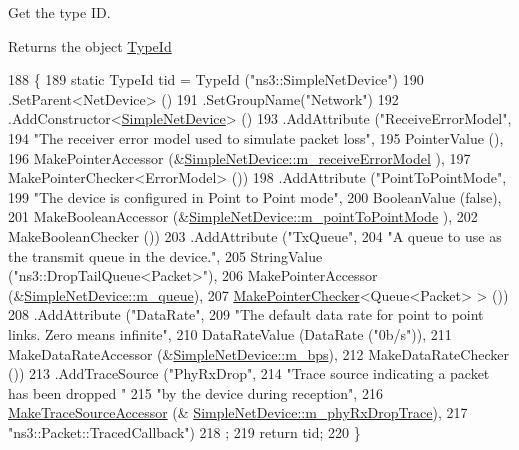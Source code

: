 Get the type ID. 

\begin{DoxyReturn}{Returns}
the object \hyperlink{classns3_1_1TypeId}{Type\+Id} 
\end{DoxyReturn}

\begin{DoxyCode}
188 \{
189   \textcolor{keyword}{static} TypeId tid = TypeId (\textcolor{stringliteral}{"ns3::SimpleNetDevice"})
190     .SetParent<NetDevice> ()
191     .SetGroupName(\textcolor{stringliteral}{"Network"}) 
192     .AddConstructor<\hyperlink{classns3_1_1SimpleNetDevice_ae329d675dae831a9e0534f02f415cf3e}{SimpleNetDevice}> ()
193     .AddAttribute (\textcolor{stringliteral}{"ReceiveErrorModel"},
194                    \textcolor{stringliteral}{"The receiver error model used to simulate packet loss"},
195                    PointerValue (),
196                    MakePointerAccessor (&\hyperlink{classns3_1_1SimpleNetDevice_aabf566ae9e1c8351769da712e7da1177}{SimpleNetDevice::m\_receiveErrorModel}
      ),
197                    MakePointerChecker<ErrorModel> ())
198     .AddAttribute (\textcolor{stringliteral}{"PointToPointMode"},
199                    \textcolor{stringliteral}{"The device is configured in Point to Point mode"},
200                    BooleanValue (\textcolor{keyword}{false}),
201                    MakeBooleanAccessor (&\hyperlink{classns3_1_1SimpleNetDevice_a9e0e98464addc8f65a1e95a405b7119c}{SimpleNetDevice::m\_pointToPointMode}
      ),
202                    MakeBooleanChecker ())
203     .AddAttribute (\textcolor{stringliteral}{"TxQueue"},
204                    \textcolor{stringliteral}{"A queue to use as the transmit queue in the device."},
205                    StringValue (\textcolor{stringliteral}{"ns3::DropTailQueue<Packet>"}),
206                    MakePointerAccessor (&\hyperlink{classns3_1_1SimpleNetDevice_a72e1e606223c7e4683f64259d14ef065}{SimpleNetDevice::m\_queue}),
207                    \hyperlink{namespacens3_a8cd81c2f226bc23ad44a259717e6da15}{MakePointerChecker}<Queue<Packet> > ())
208     .AddAttribute (\textcolor{stringliteral}{"DataRate"},
209                    \textcolor{stringliteral}{"The default data rate for point to point links. Zero means infinite"},
210                    DataRateValue (DataRate (\textcolor{stringliteral}{"0b/s"})),
211                    MakeDataRateAccessor (&\hyperlink{classns3_1_1SimpleNetDevice_a6655e469fb351d5c541abf96c2928daa}{SimpleNetDevice::m\_bps}),
212                    MakeDataRateChecker ())
213     .AddTraceSource (\textcolor{stringliteral}{"PhyRxDrop"},
214                      \textcolor{stringliteral}{"Trace source indicating a packet has been dropped "}
215                      \textcolor{stringliteral}{"by the device during reception"},
216                      \hyperlink{group__tracing_gab21a770b9855af4e8f69f7531ea4a6b0}{MakeTraceSourceAccessor} (&
      \hyperlink{classns3_1_1SimpleNetDevice_a1ff8de95910e13b1fe6c9b5c07a6f721}{SimpleNetDevice::m\_phyRxDropTrace}),
217                      \textcolor{stringliteral}{"ns3::Packet::TracedCallback"})
218   ;
219   \textcolor{keywordflow}{return} tid;
220 \}
\end{DoxyCode}


